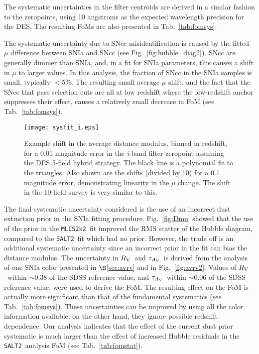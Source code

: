\documentclass[preprint2]{aastex}    %
\newcommand\rv{$R_{\rm V}$}
\newcommand\tauav{$\tau_{A_{\rm V}}$}
\newcommand{\mlcs}{{\tt MLCS2k2}}
\newcommand{\salt}{{\tt SALT2}}
\begin{document}
The systematic uncertainties in the filter centroids are derived 
in a similar fashion to the zeropoints,  using 10 angstroms
as the expected wavelength precision for the DES.  The resulting 
FoMs are also presented in Tab.~\ref{tab:fomsys}.

The systematic uncertainty due to SNcc misidentification 
is caused by the fitted-$\mu$ difference between SNIa and SNcc (see Fig.~\ref{fig:hubble_diag2}).
SNcc are generally dimmer than SNIa, and, in a fit for SNIa parameters, this 
causes a shift in $\mu$ to larger values.  In this analysis,  the
fraction of SNcc in the SNIa samples is small, typically $<$5\%.  
The resulting small average $\mu$ shift, and the fact that the SNcc that pass
selection cuts are all at low redshift where the low-redshift anchor suppresses their effect, 
causes a relatively small decrease in FoM (see Tab.~\ref{tab:fomsys}).  

\begin{figure}[ht]
\centerline{\texttt{[image: sysfit\_i.eps]}}
\caption{Example shift in the average distance modulus, binned in redshift, 
for a 0.01 magnitude error in the \textit{i}-band filter zeropoint 
assuming the DES 5-field hybrid strategy. The black line is a polynomial 
fit to the triangles. 
Also shown are the 
shifts (divided by 10) for a 0.1 magnitude error, demonstrating 
linearity in the $\mu$ change. 
The shift in the
10-field survey is very similar to this.}
\label{fig:sysfit_i}
\end{figure}

The final systematic uncertainty considered is the use 
of an incorrect dust extinction prior in the SNIa fitting procedure. 
Fig.~\ref{fig:Dmu} showed that the use of the prior 
in the \mlcs\ fit improved the RMS scatter of the Hubble diagram, 
compared to the \salt\ fit which had no prior.  However, the
trade off is an additional systematic uncertainty since 
an incorrect prior in the fit can bias the distance modulus.
The uncertainty in \rv\ and \tauav\ is derived from the 
analysis of one SNIa color presented in $\S$\ref{sec:avrv} and
in Fig.~\ref{fig:avrv2}. Values of \rv\ within $\sim$0.38 of
the SDSS reference value,  and \tauav\ within $\sim$0.06 of the
SDSS reference value, were used to derive the FoM.  
The resulting effect on the FoM is actually more significant than
that of the fundamental systematics (see Tab.~\ref{tab:fomsys}). 
These uncertainties can be improved by using all the color information 
available; on the other hand, they ignore possible redshift dependence.
Our analysis indicates that the effect of the current
dust prior systematic is much larger than the effect of 
increased Hubble residuals in the \salt\ analysis 
FoM (see Tab.~\ref{tab:fomstat}).
\end{document}
